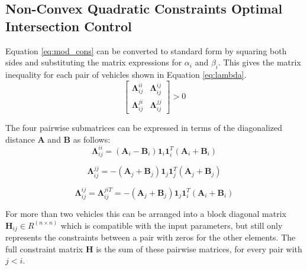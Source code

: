 \subsection{Non-Convex Quadratic Constraints Optimal Intersection Control}
\label{sec:quad}
Equation \ref{eq:mod_cons} can be converted to standard form by squaring both sides and substituting the matrix expressions for $\alpha_i$ and $\beta_i$. This gives the matrix inequality for each pair of vehicles shown in Equation \ref{eq:lambda}.
\begin{equation}
[\bm{\phi}_i^T, \bm{\phi}_j^T] \left[\begin{array}{cc}
\bm{\Lambda}_{ij}^{ii} & \bm{\Lambda}_{ij}^{ij} \\
\bm{\Lambda}_{ij}^{ji} & \bm{\Lambda}_{ij}^{jj}
\end{array}\right] > 0
\label{eq:lambda}
\end{equation}

The four pairwise submatrices can be expressed in terms of the diagonalized distance $\bm{A}$ and $\bm{B}$ as follows:
\begin{equation}
\bm{\Lambda}_{ij}^{ii} =  (\bm{A}_i - \bm{B}_i)\bm{1}_i\bm{1}_i^T(\bm{A}_i + \bm{B}_i)
\end{equation}

\begin{equation}
\bm{\Lambda}_{ij}^{jj} =  - (\bm{A}_j + \bm{B}_j)\bm{1}_j\bm{1}_j^T(\bm{A}_j + \bm{B}_j)
\end{equation}

\begin{equation}
\bm{\Lambda}_{ij}^{ij} = \bm{\Lambda}_{ij}^{ji T}  =  - (\bm{A}_j + \bm{B}_j)\bm{1}_j\bm{1}_i^T(\bm{A}_i + \bm{B}_i)
\end{equation}

For more than two vehicles this can be arranged into a
block diagonal matrix $\bm{H}_{ij} \in R^{(n \times n)}$ which is compatible with the input parameters, but still only represents the constraints between a pair with zeros for the other elements. The full constraint matrix $\bm{H}$ is the sum of these pairwise matrices, for every pair with $j<i$. 










